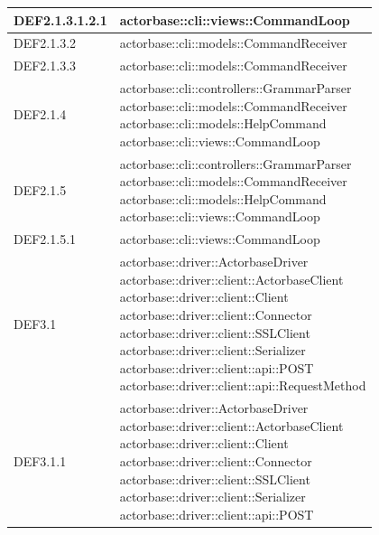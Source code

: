 \documentclass{scalatekids-article}
\begin{document}
\begin{longtable}[H]{|p{4.5cm}|p{13cm}|}
  \hline
  DEF2.1.3.1.2.1 & \multiLineCell[t]{actorbase::cli::views::CommandLoop\\}\\
  \hline
  DEF2.1.3.2 & \multiLineCell[t]{actorbase::cli::models::CommandReceiver\\}\\
  \hline
  DEF2.1.3.3 & \multiLineCell[t]{actorbase::cli::models::CommandReceiver\\}\\
  \hline
  DEF2.1.4 & \multiLineCell[t]{actorbase::cli::controllers::GrammarParser\\actorbase::cli::models::CommandReceiver\\actorbase::cli::models::HelpCommand\\actorbase::cli::views::CommandLoop\\}\\
  \hline
  DEF2.1.5 & \multiLineCell[t]{actorbase::cli::controllers::GrammarParser\\actorbase::cli::models::CommandReceiver\\actorbase::cli::models::HelpCommand\\actorbase::cli::views::CommandLoop\\}\\
  \hline
  DEF2.1.5.1 & \multiLineCell[t]{actorbase::cli::views::CommandLoop\\}\\
  \hline
  DEF3.1 & \multiLineCell[t]{actorbase::driver::ActorbaseDriver\\actorbase::driver::client::ActorbaseClient\\actorbase::driver::client::Client\\actorbase::driver::client::Connector\\actorbase::driver::client::SSLClient\\actorbase::driver::client::Serializer\\actorbase::driver::client::api::POST\\actorbase::driver::client::api::RequestMethod\\}\\
  \hline
  DEF3.1.1 & \multiLineCell[t]{actorbase::driver::ActorbaseDriver\\actorbase::driver::client::ActorbaseClient\\actorbase::driver::client::Client\\actorbase::driver::client::Connector\\actorbase::driver::client::SSLClient\\actorbase::driver::client::Serializer\\actorbase::driver::client::api::POST\\}\\

\end{longtable}
\end{document}
